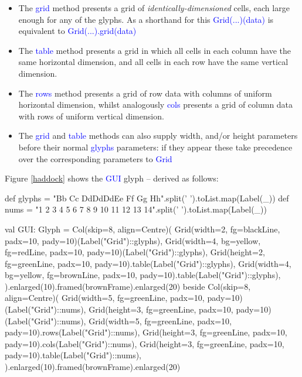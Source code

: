 \documentclass[12pt,a4paper]{article}
\def\Scala#1{\textcolor{blue}{\textsf{#1}}}
\let\scalasize=\footnotesize
\begin{document}
\begin{itemize}
\item The \Scala{grid} method presents a grid of
\textit{identically-dimensioned} cells, each large enough for any
of the glyphs. As a shorthand for this \Scala{Grid(...)(data)} is
equivalent to \Scala{Grid(...).grid(data)}

\item The \Scala{table} method presents a grid in which all cells in each
column have the same horizontal dimension, and all cells in each
row have the same vertical dimension.

\item The \Scala{rows} method presents a grid of row data with columns of uniform horizontal dimension, whilst
analogously  \Scala{cols} presents a grid of column data with rows of uniform vertical dimension.

\item The \Scala{grid} and \Scala{table} methods can also supply width, and/or height parameters
      before their normal \Scala{glyphs} parameters: if they appear these take precedence over
      the corresponding parameters to \Scala{Grid}
\end{itemize}

Figure \ref{haddock} shows the \Scala{GUI} glyph -- derived as follows:

\let\scalasize\scriptsize
\begin{scala}
 def glyphs = "Bb Cc DdDdDd\ndddddddd Ee Ff Gg Hh".split(' ').toList.map(Label(_))
 def nums = "1 2 3 4 5 6 7 8 9 10 11 12 13 14".split(' ').toList.map(Label(_))

 val GUI: Glyph =
 Col(skip=8, align=Centre)(
   Grid(width=2,  fg=blackLine, padx=10, pady=10)(Label("Grid")::glyphs),
   Grid(width=4, bg=yellow, fg=redLine, padx=10, pady=10)(Label("Grid")::glyphs),
   Grid(height=2, fg=greenLine, padx=10, pady=10).table(Label("Grid\ntable")::glyphs),
   Grid(width=4, bg=yellow, fg=brownLine, padx=10, pady=10).table(Label("Grid\ntable")::glyphs),
   ).enlarged(10).framed(brownFrame).enlarged(20) beside 
 Col(skip=8, align=Centre)(
   Grid(width=5, fg=greenLine, padx=10, pady=10)(Label("Grid")::nums),
   Grid(height=3, fg=greenLine, padx=10, pady=10)(Label("Grid")::nums),
   Grid(width=5, fg=greenLine, padx=10, pady=10).rows(Label("Grid\nrows")::nums),
   Grid(height=3, fg=greenLine, padx=10, pady=10).cols(Label("Grid\ncols")::nums),
   Grid(height=3, fg=greenLine, padx=10, pady=10).table(Label("Grid\ntable")::nums),
   ).enlarged(10).framed(brownFrame).enlarged(20)
\end{scala}
\end{document}
